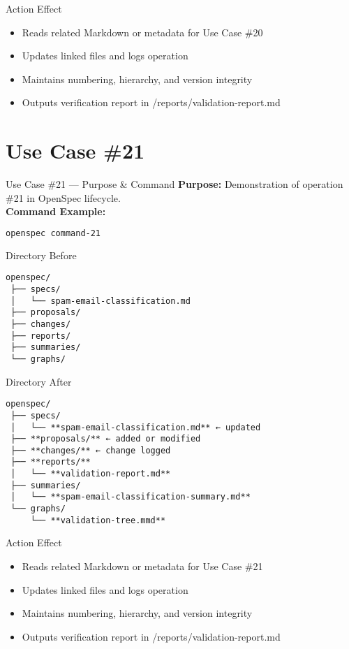 \documentclass[aspectratio=169]{beamer}
\begin{document}
\begin{frame}{Action Effect}
\begin{itemize}
  \item Reads related Markdown or metadata for Use Case \#20
  \item Updates linked files and logs operation
  \item Maintains numbering, hierarchy, and version integrity
  \item Outputs verification report in /reports/validation-report.md
\end{itemize}
\end{frame}

\section*{Use Case \#21}
\begin{frame}{Use Case \#21 --- Purpose \& Command}
\textbf{Purpose:} Demonstration of operation \#21 in OpenSpec lifecycle.\\[4pt]
\textbf{Command Example:}
\begin{lstlisting}[language=bash]
openspec command-21
\end{lstlisting}
\end{frame}

\begin{frame}{Directory Before}
\begin{lstlisting}
openspec/
 ├── specs/
 │   └── spam-email-classification.md
 ├── proposals/
 ├── changes/
 ├── reports/
 ├── summaries/
 └── graphs/
\end{lstlisting}
\end{frame}

\begin{frame}{Directory After}
\begin{lstlisting}
openspec/
 ├── specs/
 │   └── **spam-email-classification.md** ← updated
 ├── **proposals/** ← added or modified
 ├── **changes/** ← change logged
 ├── **reports/**
 │   └── **validation-report.md**
 ├── summaries/
 │   └── **spam-email-classification-summary.md**
 └── graphs/
     └── **validation-tree.mmd**
\end{lstlisting}
\end{frame}

\begin{frame}{Action Effect}
\begin{itemize}
  \item Reads related Markdown or metadata for Use Case \#21
  \item Updates linked files and logs operation
  \item Maintains numbering, hierarchy, and version integrity
  \item Outputs verification report in /reports/validation-report.md
\end{itemize}
\end{frame}
\end{document}
